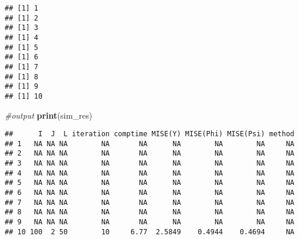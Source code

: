 \documentclass[
]{article}
\newenvironment{Shaded}{\begin{snugshade}}{\end{snugshade}}
\newcommand{\CommentTok}[1]{\textcolor[rgb]{0.56,0.35,0.01}{\textit{#1}}}
\newcommand{\ControlFlowTok}[1]{\textcolor[rgb]{0.13,0.29,0.53}{\textbf{#1}}}
\newcommand{\DecValTok}[1]{\textcolor[rgb]{0.00,0.00,0.81}{#1}}
\newcommand{\FunctionTok}[1]{\textcolor[rgb]{0.13,0.29,0.53}{\textbf{#1}}}
\newcommand{\NormalTok}[1]{#1}
\newcommand{\OtherTok}[1]{\textcolor[rgb]{0.56,0.35,0.01}{#1}}
\newcommand{\SpecialCharTok}[1]{\textcolor[rgb]{0.81,0.36,0.00}{\textbf{#1}}}
\begin{document}
\begin{Shaded}
\end{Shaded}

\begin{verbatim}
## [1] 1
## [1] 2
## [1] 3
## [1] 4
## [1] 5
## [1] 6
## [1] 7
## [1] 8
## [1] 9
## [1] 10
\end{verbatim}

\begin{Shaded}
\begin{Highlighting}[]
  \CommentTok{\#output}
  \FunctionTok{print}\NormalTok{(sim\_res)}
\end{Highlighting}
\end{Shaded}

\begin{verbatim}
##      I  J  L iteration comptime MISE(Y) MISE(Phi) MISE(Psi) method
## 1   NA NA NA        NA       NA      NA        NA        NA     NA
## 2   NA NA NA        NA       NA      NA        NA        NA     NA
## 3   NA NA NA        NA       NA      NA        NA        NA     NA
## 4   NA NA NA        NA       NA      NA        NA        NA     NA
## 5   NA NA NA        NA       NA      NA        NA        NA     NA
## 6   NA NA NA        NA       NA      NA        NA        NA     NA
## 7   NA NA NA        NA       NA      NA        NA        NA     NA
## 8   NA NA NA        NA       NA      NA        NA        NA     NA
## 9   NA NA NA        NA       NA      NA        NA        NA     NA
## 10 100  2 50        10     6.77  2.5849    0.4944    0.4694     NA
\end{verbatim}
\end{document}
